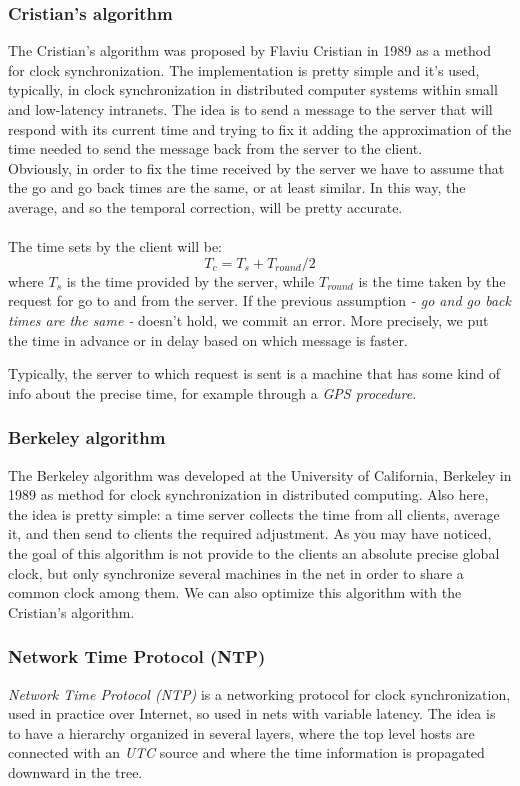 \subsubsection{Cristian's algorithm}
The Cristian's algorithm was proposed by Flaviu Cristian in 1989 as a method for clock synchronization. The implementation is pretty simple and it's used, typically, in clock synchronization in distributed computer systems within small and low-latency intranets. The idea is to send a message to the server that will respond with its current time and trying to fix it adding the approximation of the time needed to send the message back from the server to the client.\\
Obviously, in order to fix the time received by the server we have to assume that the go and go back times are the same, or at least similar. In this way, the average, and so the temporal correction, will be pretty accurate.\\
\\
The time sets by the client will be:
\begin{equation*}
    T_c = T_s + T_{round} / 2
\end{equation*}
where $T_s$ is the time provided by the server, while $T_{round}$ is the time taken by the request for go to and from the server. If the previous assumption \textit{- go and go back times are the same -} doesn't hold, we commit an error. More precisely, we put the time in advance or in delay based on which message is faster.

Typically, the server to which request is sent is a machine that has some kind of info about the precise time, for example through a \textit{\textit{GPS procedure}}.

\subsubsection{Berkeley algorithm}
The Berkeley algorithm was developed at the University of California, Berkeley in 1989 as method for clock synchronization in distributed computing. Also here, the idea is pretty simple: a time server collects the time from all clients, average it, and then send to clients the required adjustment. As you may have noticed, the goal of this algorithm is not provide to the clients an absolute precise global clock, but only synchronize several machines in the net in order to share a common clock among them.
We can also optimize this algorithm with the Cristian's algorithm.

\subsubsection{Network Time Protocol (NTP)}
\textit{Network Time Protocol (NTP)} is a networking protocol for clock synchronization, used in practice over Internet, so used in nets with variable latency. The idea is to have a hierarchy organized in several layers, where the top level hosts are connected with an \textit{UTC} source and where the time information is propagated downward in the tree.

